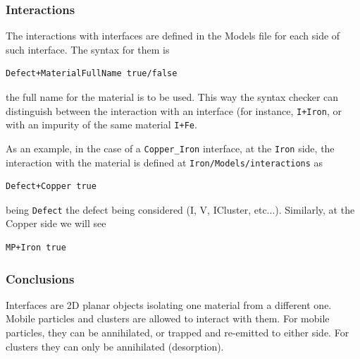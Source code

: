 \subsubsection{Interactions}

The interactions with interfaces are defined in the {\param Models} file for each side of such interface. The syntax for them is
\begin{lstlisting}
Defect+MaterialFullName true/false
\end{lstlisting}
the full name for the material is to be used. This way the syntax checker can distinguish between the interaction with an interface (for instance, {\tt I+Iron}, or with an impurity of the same material {\tt I+Fe}.


As an example, in the case of a {\tt Copper\verb+_+Iron} interface, at the {\tt Iron} side, the interaction with the material  is defined at {\tt Iron/Models/interactions} as
\begin{lstlisting}
Defect+Copper true
\end{lstlisting}
being {\tt Defect} the defect being considered (I, V, ICluster, etc...). Similarly, at the Copper side we will see
\begin{lstlisting}
MP+Iron true
\end{lstlisting}

\subsubsection{Conclusions}
Interfaces are 2D planar objects isolating one material from a different one. Mobile particles and clusters are allowed to interact with them. For mobile particles, they can be annihilated, or trapped and re-emitted to either side. For clusters they can only be annihilated (desorption). 

